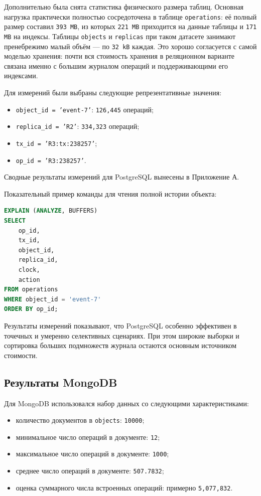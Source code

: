 \documentclass[a4paper,14pt]{extarticle}
\def\makefirstuc#1{#1}%
\def\normalsize{}%
\def\textbf#1{#1}%
\newcommand{\mysubsection}[1]{%
    \subsection{\normalsize\makefirstuc{#1}}
}
\begin{document}
Дополнительно была снята статистика физического размера таблиц. Основная
нагрузка практически полностью сосредоточена в таблице \texttt{operations}:
её полный размер составил \texttt{393 MB}, из которых \texttt{221 MB}
приходится на данные таблицы и \texttt{171 MB} на индексы. Таблицы
\texttt{objects} и \texttt{replicas} при таком датасете занимают пренебрежимо
малый объём --- по \texttt{32 kB} каждая. Это хорошо согласуется с самой
моделью хранения: почти вся стоимость хранения в реляционном варианте связана
именно с большим журналом операций и поддерживающими его индексами.

Для измерений были выбраны следующие репрезентативные значения:
\begin{itemize}[leftmargin=1.25cm]
    \item \texttt{object\_id = 'event-7'}: \texttt{126,445} операций;
    \item \texttt{replica\_id = 'R2'}: \texttt{334,323} операций;
    \item \texttt{tx\_id = 'R3:tx:238257'};
    \item \texttt{op\_id = 'R3:238257'}.
\end{itemize}

Сводные результаты измерений для PostgreSQL вынесены в
\textbf{Приложение А}.

Показательный пример команды для чтения полной истории объекта:

\begin{lstlisting}[language=SQL,caption={Пример EXPLAIN ANALYZE для истории объекта в PostgreSQL}]
EXPLAIN (ANALYZE, BUFFERS)
SELECT
    op_id,
    tx_id,
    object_id,
    replica_id,
    clock,
    action
FROM operations
WHERE object_id = 'event-7'
ORDER BY op_id;
\end{lstlisting}

Результаты измерений показывают, что PostgreSQL особенно эффективен в точечных
и умеренно селективных сценариях. При этом широкие выборки и сортировка больших
подмножеств журнала остаются основным источником стоимости.

\mysubsection{Результаты MongoDB}

Для MongoDB использовался набор данных со следующими характеристиками:
\begin{itemize}[leftmargin=1.25cm]
    \item количество документов в \texttt{objects}: \texttt{10000};
    \item минимальное число операций в документе: \texttt{12};
    \item максимальное число операций в документе: \texttt{1000};
    \item среднее число операций в документе: \texttt{507.7832};
    \item оценка суммарного числа встроенных операций: примерно \texttt{5,077,832}.
\end{itemize}
\end{document}
